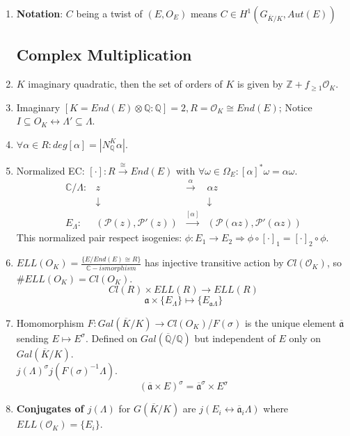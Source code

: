 \documentclass{article}
\newcommand{\Q}{\mathbb{Q}}
\newcommand{\C}{\mathbb{C}}
\newcommand{\Z}{\mathbb{Z}}
\newcommand{\OO}{\mathcal{O}}
\newcommand{\af}{\mathfrak{a}}
\newcommand{\wf}{\mathcal{P}}
\newcommand{\ra}{\rightarrow}
\newcommand{\Ra}{\Rightarrow}
\newcommand{\lra}{\leftrightarrow}
\newcommand{\da}{\downarrow}
\newcommand{\raa}[1]{\overset{#1}{\longrightarrow}}
\newcommand{\ACK}{\overline{K}}
\begin{document}
\begin{multicols}{2}
\begin{enumerate}
\item \textbf{Notation}: $C$ being a twist of $(E,O_E)$ means $C \in H^1(G_{\ACK/K},Aut(E))$

\subsection{Complex Multiplication}
\item $K$ imaginary quadratic, then the set of orders of $K$ is given by $\Z + f_{\geq 1}\OO_K$.

\item Imaginary $[K = End(E) \otimes \Q:\Q] = 2, R = \OO_K \cong End(E)$; Notice $I \subseteq O_K \lra \Lambda' \subseteq \Lambda$.
\item  $\forall \alpha \in R: deg[\alpha] = |N_\Q^K\alpha|$. 

\item Normalized EC: $[\cdot]: R \raa{\cong} End(E)$ with $\forall \omega \in \Omega_E: [\alpha]^* \omega = \alpha \omega$. 
\[\begin{array}{cccc}
\C/\Lambda: & z & \raa{\alpha} & \alpha z \\
& \da && \da \\
 E_\Lambda: & (\wf(z), \wf'(z))  & \raa{[\alpha]} & (\wf(\alpha z), \wf'(\alpha z))\end{array}\]
This normalized pair respect isogenies: $\phi: E_1 \ra E_2 \Ra \phi \circ [\cdot]_1 = [\cdot]_2 \circ \phi$.\\

\item $ELL(O_K) = \frac{\{E/End(E) \cong R\}}{\C-ismorphism}$ has injective transitive action by $Cl(\OO_K)$, so $\#ELL(O_K) = Cl(O_K)$.
\[Cl(R) \times ELL(R) \ra ELL(R)\]
\[\af \times \{E_\Lambda\} \mapsto \{E_{\af \Lambda}\}\]

\item Homomorphism $F: Gal(\overline{K}/K) \ra Cl(O_K)$/$F(\sigma)$ is the unique element $\overline{\af}$ sending $E \mapsto E^\sigma$. Defined on $Gal(\overline{\Q}/\Q)$ but independent of $E$ only on $Gal(\overline{K}/K)$.\\
$j(\Lambda)^\sigma  j(F(\sigma)^{-1}\Lambda)$. \\
\[ (\overline{\af} \times E)^\sigma = \overline{\af}^\sigma \times E^\sigma \]

\item \textbf{Conjugates of $j(\Lambda)$} for $G(\overline{K}/K)$ are $j(E_i \lra \overline{\af}_i\Lambda)$ where $ELL(\OO_K) = \{E_i\}$.


\end{enumerate}
\end{multicols}
\end{document}
